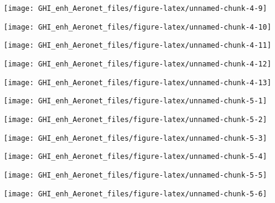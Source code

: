 \documentclass[
  10pt,
  a4paper,oneside]{article}
\begin{document}
\begin{center}\texttt{[image: GHI\_enh\_Aeronet\_files/figure-latex/unnamed-chunk-4-9]} \end{center}

\begin{center}\texttt{[image: GHI\_enh\_Aeronet\_files/figure-latex/unnamed-chunk-4-10]} \end{center}

\begin{center}\texttt{[image: GHI\_enh\_Aeronet\_files/figure-latex/unnamed-chunk-4-11]} \end{center}

\begin{center}\texttt{[image: GHI\_enh\_Aeronet\_files/figure-latex/unnamed-chunk-4-12]} \end{center}

\begin{center}\texttt{[image: GHI\_enh\_Aeronet\_files/figure-latex/unnamed-chunk-4-13]} \end{center}

\begin{center}\texttt{[image: GHI\_enh\_Aeronet\_files/figure-latex/unnamed-chunk-5-1]} \end{center}

\begin{center}\texttt{[image: GHI\_enh\_Aeronet\_files/figure-latex/unnamed-chunk-5-2]} \end{center}

\begin{center}\texttt{[image: GHI\_enh\_Aeronet\_files/figure-latex/unnamed-chunk-5-3]} \end{center}

\begin{center}\texttt{[image: GHI\_enh\_Aeronet\_files/figure-latex/unnamed-chunk-5-4]} \end{center}

\begin{center}\texttt{[image: GHI\_enh\_Aeronet\_files/figure-latex/unnamed-chunk-5-5]} \end{center}

\begin{center}\texttt{[image: GHI\_enh\_Aeronet\_files/figure-latex/unnamed-chunk-5-6]} \end{center}
\end{document}
